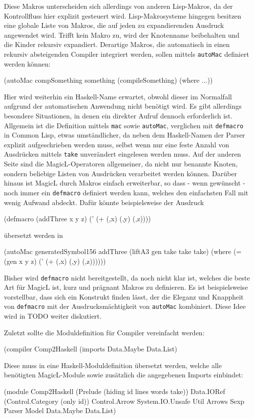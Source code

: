 \documentclass[11pt, a4paper, bibgerm]{scrbook}
\newcommand\icode[1]{\lstinline?#1?}
\newcommand\sref{}
\begin{document}
Diese Makros unterscheiden sich allerdings von anderen Lisp-Makros, da
der Kontrollfluss hier explizit gesteuert wird. Lisp-Makrosysteme
hingegen besitzen eine globale Liste von Makros, die auf jeden zu
expandierenden Ausdruck angewendet wird. Trifft kein Makro zu, wird der
Knotenname beibehalten und die Kinder rekursiv expandiert. Derartige
Makros, die automatisch in einen rekursiv absteigenden Compiler
integriert werden, sollen mittels \icode{autoMac} definiert werden
können:
\begin{code}
(autoMac compSomething something
    (compileSomething)
  (where ...))
\end{code}
Hier wird weiterhin ein Haskell-Name erwartet, obwohl dieser im
Normalfall aufgrund der automatischen Anwendung nicht benötigt wird. Es
gibt allerdings besondere Situationen, in denen ein direkter Aufruf
dennoch erforderlich ist. Allgemein ist die Definition
mittels \icode{mac} sowie \icode{autoMac}, verglichen mit
\icode{defmacro} in Common Lisp, etwas umständlicher, da neben dem
Haskell-Namen der Parser explizit aufgeschrieben werden muss, selbst
wenn nur eine feste Anzahl von Ausdrücken mittels \icode{take}
unverändert eingelesen werden muss. Auf der anderen Seite sind die
MagicL-Operatoren allgemeiner, da nicht nur benannte Knoten, sondern
beliebige Listen von Ausdrücken verarbeitet werden können. Darüber
hinaus ist MagicL durch Makros einfach erweiterbar, so dass - wenn
gewünscht - noch immer ein \icode{defmacro} definiert werden kann,
welches den einfachsten Fall mit wenig Aufwand abdeckt. Dafür könnte
beispielsweise der Ausdruck
\begin{code}
(defmacro (addThree x y z)
  (' (+ (,x) (,y) (,z))))
\end{code}
übersetzt werden in
\begin{code}
(autoMac generatedSymbol156 addThree
   (liftA3 gen take take take)
  (where (= (gen x y z)
            (' (+ (,x) (,y) (,z))))))
\end{code}
Bisher wird \icode{defmacro} nicht bereitgestellt, da noch nicht klar
ist, welches die beste Art für MagicL ist, kurz und prägnant Makros zu
definieren. Es ist beispielsweise vorstellbar, dass sich ein Konstrukt
finden lässt, der die Eleganz und Knappheit von \icode{defmacro} mit der
Ausdrucksmächtigkeit von \icode{autoMac} kombiniert. Diese Idee wird in
\sref{TODO} weiter diskutiert.

Zuletzt sollte die Moduldefinition für Compiler vereinfacht werden:
\begin{code}
(compiler Comp2Haskell (imports Data.Maybe Data.List)  
\end{code}
Diese muss in eine Haskell-Moduldefinition übersetzt werden, welche alle
benötigten MagicL-Module sowie zusätzlich die angegebenen Imports
einbindet:
\begin{code}
(module
  Comp2Haskell
  (Prelude (hiding id lines words take))
  Data.IORef
  (Control.Category (only id))
  Control.Arrow
  System.IO.Unsafe
  Util
  Arrows
  Sexp
  Parser
  Model
  Data.Maybe
  Data.List)
\end{code}
\end{document}
